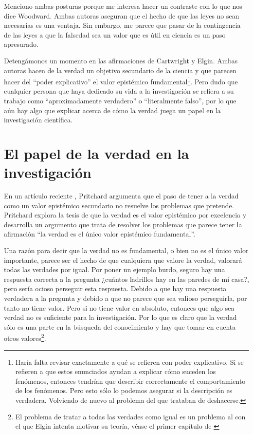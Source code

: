 Menciono ambas posturas porque me interesa hacer un contraste con lo que nos dice Woodward. Ambas autoras aseguran que el hecho de que las leyes no sean necesarias es una ventaja. Sin embargo, me parece que pasar de la contingencia de las leyes a que la falsedad sea un valor que es útil en ciencia es un paso apresurado.

Detengámonos un momento en las afirmaciones de Cartwright y Elgin. Ambas autoras hacen de la verdad un objetivo secundario de la ciencia y que parecen hacer del ``poder explicativo'' el valor epistémico fundamental\footnote{Haría falta revisar exactamente a qué se refieren con poder explicativo. Si se refieren a que estos enunciados ayudan a explicar cómo suceden los fenómenos, entonces tendrían que describir correctamente el comportamiento de los fenómenos. Pero esto sólo lo podemos asegurar si la descripción es verdadera. Volviendo de nuevo al problema del que trataban de deshacerse.}. Pero dudo que cualquier persona que haya dedicado su vida a la investigación se refiera a su trabajo como ``aproximadamente verdadero'' o ``literalmente falso'', por lo que aún hay algo que explicar acerca de cómo la verdad juega un papel en la investigación científica.

\section{El papel de la verdad en la investigación}

\noindent En un artículo reciente \cite{Pritchard2019}, Pritchard argumenta que el paso de tener a la verdad como un valor epistémico secundario no resuelve los problemas que pretende. Pritchard explora la tesis de que la verdad es el valor epistémico por excelencia y desarrolla un argumento que trata de resolver los problemas que parece tener la afirmación ``la verdad es el único valor epistémico fundamental''.

Una razón para decir que la verdad no es fundamental, o bien no es el único valor importante, parece ser el hecho de que cualquiera que valore la verdad, valorará todas las verdades por igual. Por poner un ejemplo burdo, seguro hay una respuesta correcta a la pregunta ¿cuántos ladrillos hay en las paredes de mi casa?, pero sería ocioso perseguir esta respuesta. Debido a que hay una respuesta verdadera a la pregunta y debido a que no parece que sea valioso perseguirla, por tanto no tiene valor. Pero si no tiene valor en absoluto, entonces que algo sea verdad no es suficiente para la investigación. Por lo que es claro que la verdad sólo es una parte en la búsqueda del conocimiento y hay que tomar en cuenta otros valores\footnote{El problema de tratar a todas las verdades como igual es un problema al con el que Elgin intenta motivar su teoría, véase el primer capítulo de \cite{Elgin2017}}.

